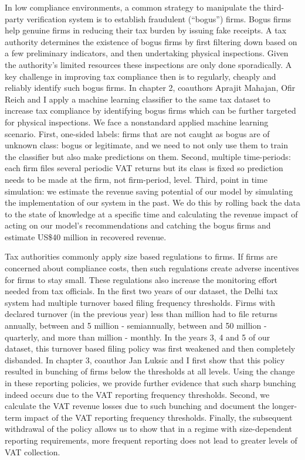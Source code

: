 {In low compliance environments, a common strategy to manipulate the third-party verification system is to establish fraudulent (``bogus'') firms. Bogus firms help genuine firms in reducing their tax burden by issuing fake receipts. A tax authority determines the existence of bogus firms by first filtering down based on a few preliminary indicators, and then undertaking  physical inspections. Given the authority’s limited resources these inspections are only done sporadically. A key challenge in improving tax compliance then is to regularly, cheaply and reliably identify such bogus firms. In chapter 2, coauthors Aprajit Mahajan, Ofir Reich and I apply a machine learning classifier to the same tax dataset to increase tax compliance by identifying bogus firms which can be further targeted for physical inspections. We face a nonstandard applied machine learning scenario. First, one-sided labels: firms that are not caught as bogus are of unknown class: bogus or legitimate, and we need to not only use them to train the classifier but also make predictions on them. Second, multiple time-periods: each firm files several periodic VAT returns but its class is fixed so prediction needs to be made at the firm, not firm-period, level. Third, point in time simulation: we estimate the revenue saving potential of our model by simulating the implementation of our system in the past. We do this by rolling back the data to the state of knowledge at a specific time and calculating the revenue impact of acting on our model’s recommendations and catching the bogus firms and estimate US\$40 million in recovered revenue.

Tax authorities commonly apply size based regulations to firms. If firms are concerned about compliance costs, then such regulations create adverse incentives for firms to stay small. These regulations also increase the monitoring effort needed from tax officials. In the first two years of our dataset, the Delhi tax system had multiple turnover based filing frequency thresholds. Firms with declared turnover (in the previous year) less than  million had to file returns annually, between  and 5 million - semiannually, between  and 50 million - quarterly, and more than  million - monthly. In the years 3, 4 and 5 of our dataset, this turnover based filing policy was first weakened and then completely disbanded. In chapter 3, coauthor Jan Luksic and I first show that this policy resulted in bunching of firms below the thresholds at all levels. Using the change in these reporting policies, we provide further evidence that such sharp bunching indeed occurs due to the VAT reporting frequency thresholds. Second, we calculate the VAT revenue losses due to such bunching and document the longer-term impact of the VAT reporting frequency thresholds. Finally, the subsequent withdrawal of the policy allows us to show that in a regime with size-dependent reporting requirements, more frequent reporting does not lead to greater levels of VAT collection.
}

